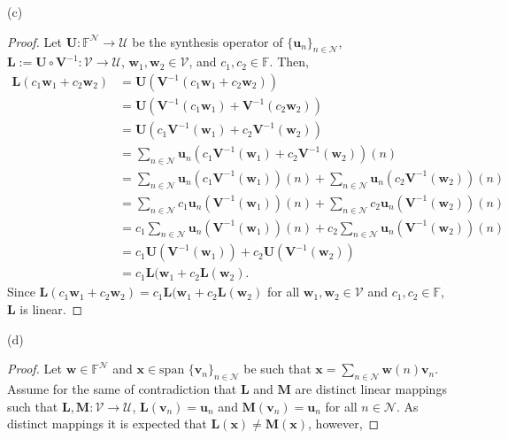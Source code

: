 \documentclass[12pt]{amsart}
\newcommand{\1}{\mathbbm{1}}
\numberwithin{equation}{section}
\numberwithin{Theorem}{section}
\theoremstyle{plain} %
\theoremstyle{definition}
\theoremstyle{remark}
\begin{document}
\begin{enumerate}[1.]
(c) 
\begin{proof}
Let
\(\mathbf{U}:\mathbb{F}^{\mathcal{N}}\to\mathcal{U}\) be the synthesis operator of \(\{\mathbf{u}_{n}\}_{n\in\mathcal{N}}\),
\(\mathbf{L}:=\mathbf{U}\circ\mathbf{V}^{-1}:\mathcal{V}\to\mathcal{U}\),
$\mathbf{w}_1,\mathbf{w}_2\in\mathcal{V}$, and
$c_1,c_2\in\mathbb{F}$.
Then,
\begin{align*}
	\mathbf{L}(c_1\mathbf{w}_1 + c_2\mathbf{w}_2)
	&= \mathbf{U}(\mathbf{V}^{-1}(c_1\mathbf{w}_1 + c_2\mathbf{w}_2)) \\
	&= \mathbf{U}(\mathbf{V}^{-1}(c_1\mathbf{w}_1) + \mathbf{V}^{-1}(c_2\mathbf{w}_2)) \\
	&= \mathbf{U}(c_1\mathbf{V}^{-1}(\mathbf{w}_1) + c_2\mathbf{V}^{-1}(\mathbf{w}_2)) \\
	&= \sum_{n\in\mathcal{N}}\mathbf{u}_n(c_1\mathbf{V}^{-1}(\mathbf{w}_1) + c_2\mathbf{V}^{-1}(\mathbf{w}_2))(n) \\
	&= \sum_{n\in\mathcal{N}}\mathbf{u}_n(c_1\mathbf{V}^{-1}(\mathbf{w}_1))(n) + \sum_{n\in\mathcal{N}}\mathbf{u}_n(c_2\mathbf{V}^{-1}(\mathbf{w}_2))(n) \\
	&= \sum_{n\in\mathcal{N}}c_1\mathbf{u}_n(\mathbf{V}^{-1}(\mathbf{w}_1))(n) + \sum_{n\in\mathcal{N}}c_2\mathbf{u}_n(\mathbf{V}^{-1}(\mathbf{w}_2))(n) \\
	&= c_1\sum_{n\in\mathcal{N}}\mathbf{u}_n(\mathbf{V}^{-1}(\mathbf{w}_1))(n) + c_2\sum_{n\in\mathcal{N}}\mathbf{u}_n(\mathbf{V}^{-1}(\mathbf{w}_2))(n) \\
	&= c_1\mathbf{U}(\mathbf{V}^{-1}(\mathbf{w}_1)) + c_2\mathbf{U}(\mathbf{V}^{-1}(\mathbf{w}_2)) \\
	&= c_1\mathbf{L}(\mathbf{w}_1 + c_2\mathbf{L}(\mathbf{w}_2).
\end{align*}
Since 
$\mathbf{L}(c_1\mathbf{w}_1 + c_2\mathbf{w}_2) = 
c_1\mathbf{L}(\mathbf{w}_1 + c_2\mathbf{L}(\mathbf{w}_2)$
for all
$\mathbf{w}_1,\mathbf{w}_2\in\mathcal{V}$ and
$c_1,c_2\in\mathbb{F}$,
$\mathbf{L}$ is linear.
\end{proof}

\clearpage
(d)
\begin{proof}
Let $\mathbf{w}\in\mathbb{F}^\mathcal{N}$ and $\mathbf{x} \in \text{span }\{\mathbf{v}_{n}\}_{n\in\mathcal{N}}$
be such that $\mathbf{x} = \sum_{n\in\mathcal{N}} \mathbf{w}(n)\mathbf{v}_n$.
Assume for the same of contradiction that $\mathbf{L}$ and $\mathbf{M}$
are distinct linear mappings such that
\(\mathbf{L},\mathbf{M}:\mathcal{V}\to\mathcal{U}\),
\(\mathbf{L}(\mathbf{v}_{n}) = \mathbf{u}_{n}\) and
\(\mathbf{M}(\mathbf{v}_{n}) = \mathbf{u}_{n}\)
for all \(n\in\mathcal{N}\). As distinct mappings it is expected that
$\mathbf{L}(\mathbf{x})\ne\mathbf{M}(\mathbf{x})$, however, 


\end{proof}
\end{enumerate}
\end{document}
